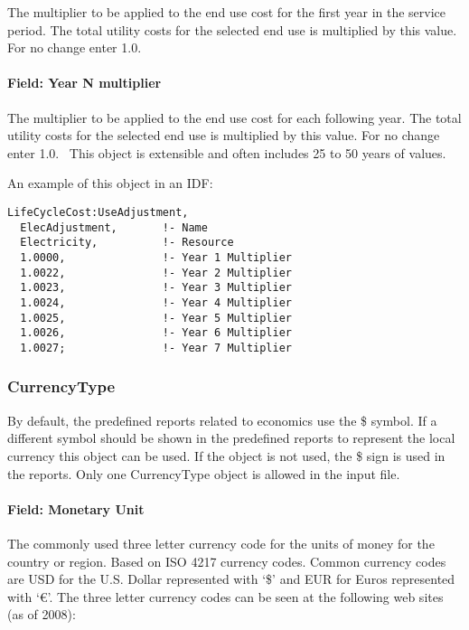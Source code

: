 The multiplier to be applied to the end use cost for the first year in the service period. The total utility costs for the selected end use is multiplied by this value. For no change enter 1.0.

\paragraph{Field: Year N multiplier}\label{field-year-n-multiplier}

The multiplier to be applied to the end use cost for each following year. The total utility costs for the selected end use is multiplied by this value. For no change enter 1.0.~ This object is extensible and often includes 25 to 50 years of values.

An example of this object in an IDF:

\begin{lstlisting}
LifeCycleCost:UseAdjustment,
  ElecAdjustment,       !- Name
  Electricity,          !- Resource
  1.0000,               !- Year 1 Multiplier
  1.0022,               !- Year 2 Multiplier
  1.0023,               !- Year 3 Multiplier
  1.0024,               !- Year 4 Multiplier
  1.0025,               !- Year 5 Multiplier
  1.0026,               !- Year 6 Multiplier
  1.0027;               !- Year 7 Multiplier
\end{lstlisting}

\subsubsection{CurrencyType}\label{currencytype}

By default, the predefined reports related to economics use the \$ symbol. If a different symbol should be shown in the predefined reports to represent the local currency this object can be used. If the object is not used, the \$ sign is used in the reports. Only one CurrencyType object is allowed in the input file.

\paragraph{Field: Monetary Unit}\label{field-monetary-unit}

The commonly used three letter currency code for the units of money for the country or region. Based on ISO 4217 currency codes. Common currency codes are USD for the U.S. Dollar represented with `\$' and EUR for Euros represented with `€'. The three letter currency codes can be seen at the following web sites (as of 2008):

